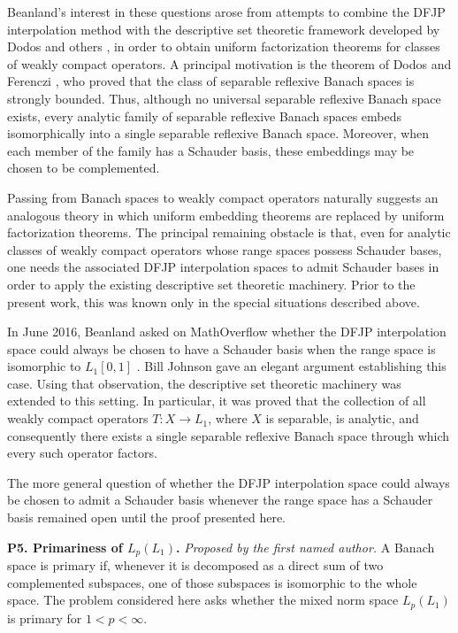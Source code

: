 \documentclass[11pt,reqno]{amsart}
\theoremstyle{plain}
\theoremstyle{definition}
\begin{document}
Beanland's interest in these questions arose from attempts to combine the DFJP interpolation method with the descriptive set theoretic framework developed by Dodos and others \cite{Dodos2010}, in order to obtain uniform factorization theorems for classes of weakly compact operators. A principal motivation is the theorem of Dodos and Ferenczi \cite{DodosFerenczi2007}, who proved that the class of separable reflexive Banach spaces is strongly bounded. Thus, although no universal separable reflexive Banach space exists, every analytic family of separable reflexive Banach spaces embeds isomorphically into a single separable reflexive Banach space. Moreover, when each member of the family has a Schauder basis, these embeddings may be chosen to be complemented.

Passing from Banach spaces to weakly compact operators naturally suggests an analogous theory in which uniform embedding theorems are replaced by uniform factorization theorems. The principal remaining obstacle is that, even for analytic classes of weakly compact operators whose range spaces possess Schauder bases, one needs the associated DFJP interpolation spaces to admit Schauder bases in order to apply the existing descriptive set theoretic machinery. Prior to the present work, this was known only in the special situations described above.

In June 2016, Beanland asked on MathOverflow whether the DFJP interpolation space could always be chosen to have a Schauder basis when the range space is isomorphic to $L_1[0,1]$ \cite{BeanlandMO2016}. Bill Johnson gave an elegant argument establishing this case. Using that observation, the descriptive set theoretic machinery was extended to this setting. In particular, it was proved that the collection of all weakly compact operators $T\colon X\to L_1$, where $X$ is separable, is analytic, and consequently there exists a single separable reflexive Banach space through which every such operator factors.

The more general question of whether the DFJP interpolation space could always be chosen to admit a Schauder basis whenever the range space has a Schauder basis remained open until the proof presented here.

\medskip

\noindent\textbf{P5. Primariness of $L_p(L_1)$.} \emph{Proposed by the first named author.} A Banach space is primary if, whenever it is decomposed as a direct sum of two complemented subspaces, one of those subspaces is isomorphic to the whole space. The problem considered here asks whether the mixed norm space $L_p(L_1)$ is primary for $1<p<\infty$.
\end{document}

